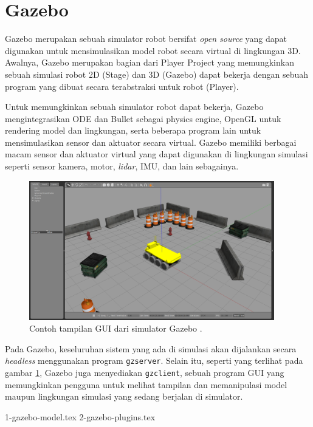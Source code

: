 \section{Gazebo}
\label{sec:gazebo}

Gazebo \citep{cit:koenig2004} merupakan sebuah simulator robot bersifat \emph{open source} yang dapat digunakan untuk mensimulasikan model robot secara virtual di lingkungan 3D.
Awalnya, Gazebo merupakan bagian dari Player Project \citep{cit:gerkey2003} yang memungkinkan sebuah simulasi robot 2D (Stage) dan 3D (Gazebo) dapat bekerja dengan sebuah program yang dibuat secara terabstraksi untuk robot (Player).

Untuk memungkinkan sebuah simulator robot dapat bekerja,
  Gazebo mengintegrasikan ODE dan Bullet sebagai physics engine,
  OpenGL untuk rendering model dan lingkungan,
  serta beberapa program lain untuk mensimulasikan sensor dan aktuator secara virtual.
Gazebo memiliki berbagai macam sensor dan aktuator virtual yang dapat digunakan di lingkungan simulasi seperti sensor kamera, motor, \emph{lidar}, IMU, dan lain sebagainya.

\begin{figure}[ht]
  \centering
  \includegraphics[width=0.95\textwidth,keepaspectratio]{gambar/contoh-gui-gazebo.png}
  \caption{Contoh tampilan GUI dari simulator Gazebo \citep{url:gazeboexample}.}
  \label{fig:contohguigazebo}
\end{figure}

Pada Gazebo, keseluruhan sistem yang ada di simulasi akan dijalankan secara \emph{headless} menggunakan program \lstinline{gzserver}.
Selain itu, seperti yang terlihat pada gambar \ref{fig:contohguigazebo},
  Gazebo juga menyediakan \lstinline{gzclient}, sebuah program GUI yang memungkinkan pengguna untuk melihat tampilan dan memanipulasi model maupun lingkungan simulasi yang sedang berjalan di simulator.

{1-gazebo-model.tex}
{2-gazebo-plugins.tex}
